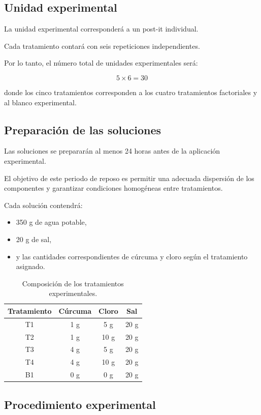 \subsection{Unidad experimental}

La unidad experimental corresponderá a un post-it individual.

Cada tratamiento contará con seis repeticiones independientes.

Por lo tanto, el número total de unidades experimentales será:

\[
5 \times 6 = 30
\]

donde los cinco tratamientos corresponden a los cuatro tratamientos factoriales y al blanco experimental.

\subsection{Preparación de las soluciones}

Las soluciones se prepararán al menos 24 horas antes de la aplicación experimental.

El objetivo de este periodo de reposo es permitir una adecuada dispersión de los componentes y garantizar condiciones homogéneas entre tratamientos.

Cada solución contendrá:

\begin{itemize}
\item 350 g de agua potable,
\item 20 g de sal,
\item y las cantidades correspondientes de cúrcuma y cloro según el tratamiento asignado.
\end{itemize}

\begin{table}[H]
\centering
\begin{tabular}{cccc}
\hline
Tratamiento & Cúrcuma & Cloro & Sal \\
\hline
T1 & 1 g & 5 g & 20 g \\
T2 & 1 g & 10 g & 20 g \\
T3 & 4 g & 5 g & 20 g \\
T4 & 4 g & 10 g & 20 g \\
B1 & 0 g & 0 g & 20 g \\
\hline
\end{tabular}
\caption{Composición de los tratamientos experimentales.}
\end{table}

\subsection{Procedimiento experimental}

